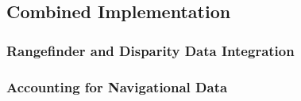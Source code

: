 \subsection{Combined Implementation}
\subsubsection{Rangefinder and Disparity Data Integration}
\subsubsection{Accounting for Navigational Data}